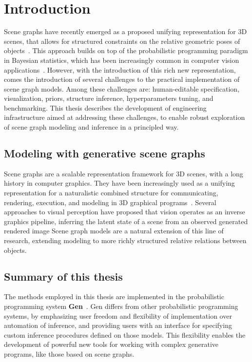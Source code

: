 \chapter{Introduction}
Scene graphs have recently emerged as a proposed unifying representation for 3D scenes, that allows for structured constraints on the relative geometric poses of objects~\cite{bzinberg2020scenegraphs, raboh2020differentiable, johnson2018image}.
This approach builds on top of the probabilistic programming paradigm in Bayesian statistics, which has been increasingly common in computer vision applications~\cite{battaglia2013simulation, izatt2020generative, jampani2015informed, kulkarni2015picture, mansinghka2013approximate, wu2017learning, wu2017neural, romaszko2017vision}.
However, with the introduction of this rich new representation, comes the introduction of several challenges to the practical implementation of scene graph models.
Among these challenges are: human-editable specification, visualization, priors, structure inference, hyperparameters tuning, and benchmarking.
This thesis describes the development of engineering infrastructure aimed at addressing these challenges, to enable robust exploration of scene graph modeling and inference in a principled way.

\pagebreak

\section{Modeling with generative scene graphs}
Scene graphs are a scalable representation framework for 3D scenes, with a long history in computer graphics.
They have been increasingly used as a unifying representation for a naturalistic combined structure for communicating, rendering, execution, and modeling in 3D graphical programs~\cite{sowizral2000scene}.
Several approaches to visual perception have proposed that vision operates as an inverse graphics pipeline, inferring the latent state of a scene from an observed generated rendered image \cite{romaszko2017vision, DBLP:journals/corr/KulkarniWKT15, moreno2016overcoming}
Scene graph models are a natural extension of this line of research, extending modeling to more richly structured relative relations between objects.

\section{Summary of this thesis}
The methods employed in this thesis are implemented in the probabilistic programming system \textbf{Gen}~\cite{Cusumano-Towner:2019:GGP:3314221.3314642}.
Gen differs from other probabilistic programming systems, by emphasizing user freedom and flexibility of implementation over automation of inference, and providing users with an interface for specifying custom inference procedures defined on those models.
This flexibility enables the development of powerful new tools for working with complex generative programs, like those based on scene graphs.

